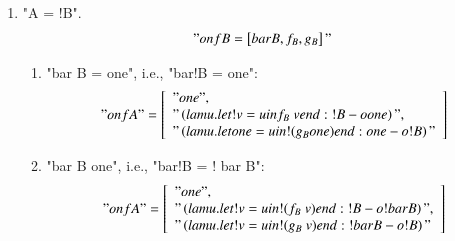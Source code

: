 \documentclass{article}
\begin{document}
\begin{enumerate}
\item "A = {!B}".
  \begin{gather*}
    "onf B = \left[ bar B, f_B, g_B \right]"
  \end{gather*}

  \begin{enumerate}
  \item "bar B = one", i.e., "bar{!B} = one":
    \begin{gather*}
      "onf A" = 
      \left[ \begin{array}{l}
           "one", \\
           "\left( lam u. let !v = u in f_B\ v end : {!B} -o one \right)",\\
           "\left( lam u. let one = u in {! ( g_B one )} end : one -o {!B} \right)"
         \end{array} \right]
    \end{gather*}

  \item "bar B \neq one", i.e., "bar{!B} = {! bar B}":
    \begin{gather*}
      "onf A" = 
      \left[ \begin{array}{l}
           "one", \\
           "\left( lam u. let !v = u in {! ( f_B\ v )} end : {!B} -o {! bar B} \right)",\\
           "\left( lam u. let !v = u in {! ( g_B\ v )} end : {! bar B} -o {!B} \right)"
         \end{array} \right]
    \end{gather*}
  \end{enumerate}
\end{enumerate}
\end{document}
